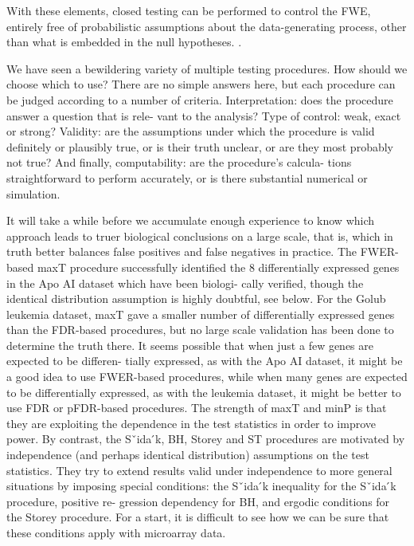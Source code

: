 \documentclass{article}
\begin{document}
With these elements, closed testing can be performed to control the FWE, entirely free of probabilistic assumptions about the data-generating process, other than what is embedded in the null hypotheses. .
   
We have seen a bewildering variety of multiple testing procedures. How should we choose which to use? There are no simple answers here, but each procedure can be judged according to a number of criteria. Interpretation: does the procedure answer a question that is rele- vant to the analysis? Type of control: weak, exact or strong? Validity: are the assumptions under which the procedure is valid definitely or plausibly true, or is their truth unclear, or are they most probably not true? And finally, computability: are the procedure’s calcula- tions straightforward to perform accurately, or is there substantial numerical or simulation. 

It will take a while before we accumulate enough experience to know which approach leads to truer biological conclusions on a large scale, that is, which in truth better balances false positives and false negatives in practice. The FWER-based maxT procedure successfully identified the 8 differentially expressed genes in the Apo AI dataset which have been biologi- cally verified, though the identical distribution assumption is highly doubtful, see below. For the Golub leukemia dataset, maxT gave a smaller number of differentially expressed genes than the FDR-based procedures, but no large scale validation has been done to determine the truth there. It seems possible that when just a few genes are expected to be differen- tially expressed, as with the Apo AI dataset, it might be a good idea to use FWER-based procedures, while when many genes are expected to be differentially expressed, as with the leukemia dataset, it might be better to use FDR or pFDR-based procedures.  
The strength of maxT and minP is that they are exploiting the dependence in the test statistics in order to improve power. By contrast, the Sˇida ́k, BH, Storey and ST procedures are motivated by independence (and perhaps identical distribution) assumptions on the test statistics. They try to extend results valid under independence to more general situations by imposing special conditions: the Sˇida ́k inequality for the Sˇida ́k procedure, positive re- gression dependency for BH, and ergodic conditions for the Storey procedure. For a start, it is difficult to see how we can be sure that these conditions apply with microarray data. 
\end{document}
